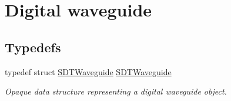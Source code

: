 \hypertarget{group__waveguide}{}\section{Digital waveguide}
\label{group__waveguide}
\subsection*{Typedefs}
\begin{DoxyCompactItemize}
\item 
\hypertarget{group__waveguide_gacfb2f045a30d1c89f0dc98ad18777f3d}{}typedef struct \hyperlink{group__waveguide_gacfb2f045a30d1c89f0dc98ad18777f3d}{S\+D\+T\+Waveguide} \hyperlink{group__waveguide_gacfb2f045a30d1c89f0dc98ad18777f3d}{S\+D\+T\+Waveguide}\label{group__waveguide_gacfb2f045a30d1c89f0dc98ad18777f3d}

\begin{DoxyCompactList}\small\item\em Opaque data structure representing a digital waveguide object. \end{DoxyCompactList}\end{DoxyCompactItemize}
